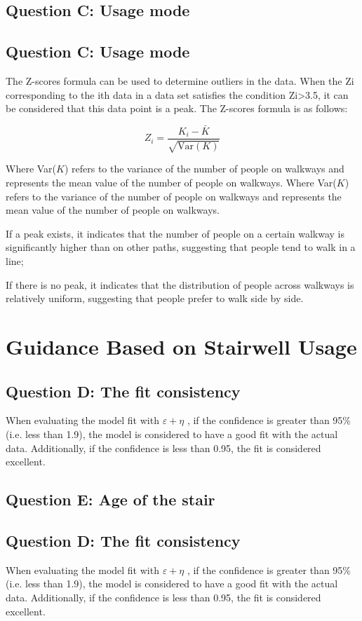 \documentclass{mcmthesis}
\begin{document}
\subsection{Question C: Usage mode}
\subsection{Question C: Usage mode}
The Z-scores formula can be used to determine outliers in the data. When the Zi corresponding to the ith data in a data set satisfies the condition Zi>3.5\cite{curtis2016mystery},  it can be considered that this data point is a peak. The Z-scores formula is as follows:

\[ Z_i = \frac{K_i - \bar{K}}{\sqrt{\text{Var}(K)}} \]

Where Var($K$) refers to the variance of the number of people on walkways and represents the mean value of the number of people on walkways.
Where Var($K$) refers to the variance of the number of people on walkways and represents the mean value of the number of people on walkways.



If a peak exists, it indicates that the number of people on a certain walkway is significantly higher than on other paths, suggesting that people tend to walk in a line;

If there is no peak, it indicates that the distribution of people across walkways is relatively uniform, suggesting that people prefer to walk side by side.

\section{Guidance Based on Stairwell Usage}
\subsection{Question D: The fit consistency}
When evaluating the model fit with $\varepsilon +\eta$ , if the confidence is greater than 95\% (i.e. less than 1.9), the model is considered to have a good fit with the actual data. Additionally, if the confidence is less than 0.95, the fit is considered excellent.
\subsection{Question E: Age of the stair }
\subsection{Question D: The fit consistency}
When evaluating the model fit with $\varepsilon +\eta$ , if the confidence is greater than 95\% (i.e. less than 1.9), the model is considered to have a good fit with the actual data. Additionally, if the confidence is less than 0.95, the fit is considered excellent.
\end{document}
